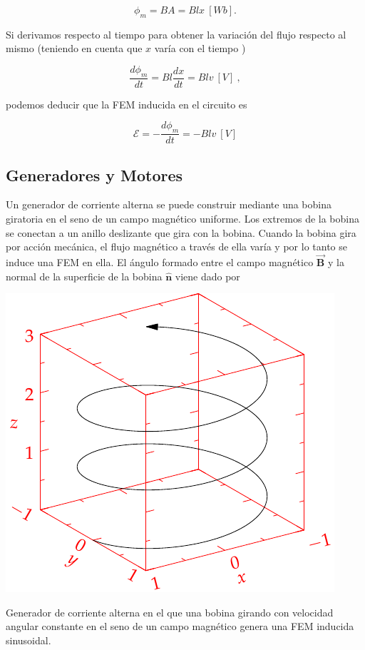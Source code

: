 \documentclass{tufte-handout}
\begin{document}
\begin{equation}
\phi_m = BA = Blx~[Wb].
\end{equation}

Si derivamos respecto al tiempo para obtener la variación del flujo respecto al mismo (teniendo en cuenta que $x$ varía con el tiempo )

\begin{equation}
\displaystyle\frac{d\phi_m}{dt} = Bl\displaystyle\frac{dx}{dt} = Blv~[V]~,
\end{equation}

podemos deducir que la FEM inducida en el circuito es

\begin{equation}
\mathcal{E} = -\displaystyle\frac{d\phi_m}{dt} = -Blv~[V]
\end{equation}

\subsection{Generadores y Motores}

Un generador de corriente alterna se puede construir mediante una bobina giratoria en el seno de un campo magnético uniforme. Los extremos de la bobina se conectan a un anillo deslizante que gira con la bobina. Cuando la bobina gira por acción mecánica, el flujo magnético a través de ella varía y por lo tanto se induce una FEM en ella. El ángulo formado entre el campo magnético $\mathbf{\vec{B}}$ y la normal de la superficie de la bobina $\mathbf{\hat{n}}$ viene dado por

\begin{marginfigure}%
    \includegraphics[width=\linewidth]{helix}
    \caption{Generador de corriente alterna en el que una bobina girando con velocidad angular constante en el seno de un campo magnético genera una FEM inducida sinusoidal.}
    \label{fig:generadorac}
\end{marginfigure}
\end{document}
